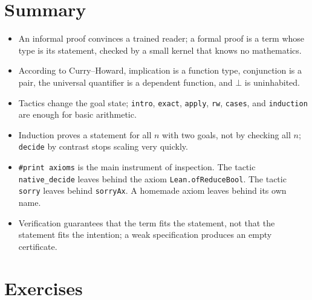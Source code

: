 \section{Summary}

\begin{ringkasan}
\begin{itemize}
  \item An informal proof convinces a trained reader; a formal proof is a term whose type is its
        statement, checked by a small kernel that knows no mathematics.
  \item According to Curry--Howard, implication is a function type, conjunction is a pair, the
        universal quantifier is a dependent function, and $\bot$ is uninhabited.
  \item Tactics change the goal state; \texttt{intro}, \texttt{exact}, \texttt{apply},
        \texttt{rw}, \texttt{cases}, and \texttt{induction} are enough for basic arithmetic.
  \item Induction proves a statement for all $n$ with two goals, not by checking all $n$;
        \texttt{decide} by contrast stops scaling very quickly.
  \item \texttt{\#print axioms} is the main instrument of inspection. The tactic
        \texttt{native\_decide} leaves behind the axiom \texttt{Lean.ofReduceBool}. The tactic
        \texttt{sorry} leaves behind \texttt{sorryAx}. A homemade axiom leaves behind its own name.
  \item Verification guarantees that the term fits the statement, not that the statement fits the
        intention; a weak specification produces an empty certificate.
\end{itemize}
\end{ringkasan}

\section{Exercises}

